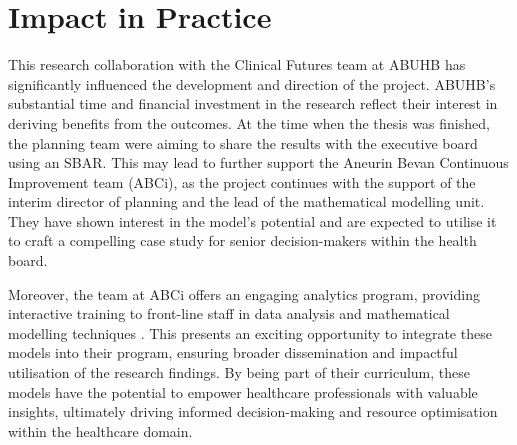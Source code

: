 \documentclass[../thesis.tex]{subfiles}
\begin{document}
\section{Impact in Practice}
This research collaboration with the Clinical Futures team at ABUHB has significantly influenced the development and direction of the project. ABUHB's substantial time and financial investment in the research reflect their interest in deriving benefits from the outcomes. At the time when the thesis was finished, the planning team were aiming to share the results with the executive board using an SBAR. This may lead to further support the Aneurin Bevan Continuous Improvement team (ABCi), as the project continues with the support of the interim director of planning and the lead of the mathematical modelling unit. They have shown interest in the model's potential and are expected to utilise it to craft a compelling case study for senior decision-makers within the health board.

Moreover, the team at ABCi offers an engaging analytics program, providing interactive training to front-line staff in data analysis and mathematical modelling techniques \cite{abcimodelling,Gartner2022a}. This presents an exciting opportunity to integrate these models into their program, ensuring broader dissemination and impactful utilisation of the research findings. By being part of their curriculum, these models have the potential to empower healthcare professionals with valuable insights, ultimately driving informed decision-making and resource optimisation within the healthcare domain.
\end{document}

